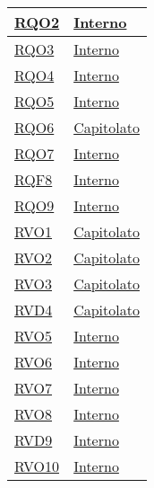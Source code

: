 \begin{longtable}{|>{\centering}m{5cm}|m{5cm}<{\centering}|}
\hyperlink{RQO2}{RQO2} & \hyperlink{Interno}{Interno}\\ \hline

\hyperlink{RQO3}{RQO3} & \hyperlink{Interno}{Interno}\\ \hline

\hyperlink{RQO4}{RQO4} & \hyperlink{Interno}{Interno}\\ \hline

\hyperlink{RQO5}{RQO5} & \hyperlink{Interno}{Interno}\\ \hline

\hyperlink{RQO6}{RQO6} & \hyperlink{Capitolato}{Capitolato}\\ \hline

\hyperlink{RQO7}{RQO7} & \hyperlink{Interno}{Interno}\\ \hline

\hyperlink{RQF8}{RQF8} & \hyperlink{Interno}{Interno}\\ \hline

\hyperlink{RQO9}{RQO9} & \hyperlink{Interno}{Interno}\\ \hline

\hyperlink{RVO1}{RVO1} & \hyperlink{Capitolato}{Capitolato}\\ \hline

\hyperlink{RVO2}{RVO2} & \hyperlink{Capitolato}{Capitolato}\\ \hline

\hyperlink{RVO3}{RVO3} & \hyperlink{Capitolato}{Capitolato}\\ \hline

\hyperlink{RVD4}{RVD4} & \hyperlink{Capitolato}{Capitolato}\\ \hline

\hyperlink{RVO5}{RVO5} & \hyperlink{Interno}{Interno}\\ \hline

\hyperlink{RVO6}{RVO6} & \hyperlink{Interno}{Interno}\\ \hline

\hyperlink{RVO7}{RVO7} & \hyperlink{Interno}{Interno}\\ \hline

\hyperlink{RVO8}{RVO8} & \hyperlink{Interno}{Interno}\\ \hline

\hyperlink{RVD9}{RVD9} & \hyperlink{Interno}{Interno}\\ \hline

\hyperlink{RVO10}{RVO10} & \hyperlink{Interno}{Interno}\\ \hline


\end{longtable}
